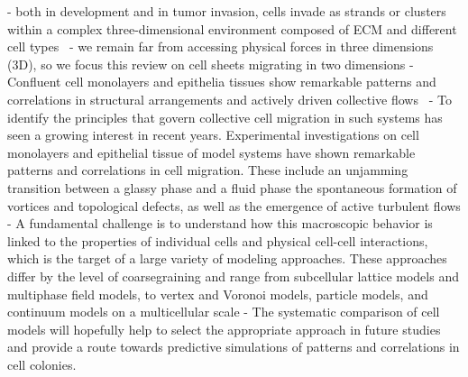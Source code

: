 - both in development and in tumor invasion, cells invade as strands or clusters within a complex three-dimensional environment composed of ECM and different cell types~\cite{friedl2009, cai2014, clark2015} 
- we remain far from accessing physical forces in three dimensions (3D), so we focus this review on cell sheets migrating in two dimensions
- Confluent cell monolayers and epithelia tissues show remarkable patterns and correlations in structural arrangements and actively driven collective flows~\cite{wenzel2021}
- To identify the principles that govern collective cell migration in such systems has seen a growing interest in recent years. Experimental investigations on cell monolayers and epithelial tissue of model systems have shown remarkable patterns and correlations in cell migration. These include an unjamming transition between a glassy phase and a fluid phase the spontaneous formation of vortices and topological defects, as well as the emergence of active turbulent flows
- A fundamental challenge is to understand how this macroscopic behavior is linked to the properties of individual cells and physical cell-cell interactions, which is the target of a large variety of modeling approaches. These approaches differ by the level of coarsegraining and range from subcellular lattice models and multiphase field models, to vertex and Voronoi models, particle models, and continuum models on a multicellular scale 
- The systematic comparison of cell models will hopefully help to select the appropriate approach in future studies and provide a route towards predictive simulations of patterns and correlations in cell colonies.

